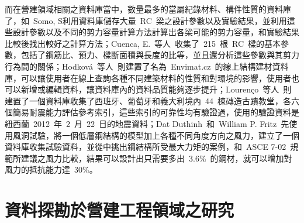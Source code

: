 而在營建領域相關之資料庫當中，數量最多的當屬紀錄材料、構件性質的資料庫了，如~Somo, S\cite{somo2006modeling}利用資料庫儲存大量~RC~梁之設計參數以及實驗結果，並利用這些設計參數以及不同的剪力容量計算方法計算出各梁可能的剪力容量，和實驗結果比較後找出較好之計算方法；Cuenca, E.~等人\cite{Cuenca20131089}~收集了~215~根~RC~樑的基本參數，包括了鋼筋比、預力、樑斷面積與長度的比等，並且還分析這些參數與其剪力行為間的關係；Hodkov{\'a}~等人\cite{hodkova2011envimat}~則建置了名為~Envimat.cz~的線上結構建材資料庫，可以讓使用者在線上查詢各種不同建築材料的性質和對環境的影響，使用者也可以新增或編輯資料，讓資料庫內的資料品質能夠逐步提升；Louren{\c{c}}o~等人\cite{lourencco2013simplified}~則建置了一個資料庫收集了西班牙、葡萄牙和義大利境內~44~棟磚造古蹟教堂，各六個簡易耐震能力評估參考索引，這些索引的可靠性均有驗證過，使用的驗證資料是紐西蘭~2012~年~2~月~22~日的地震資料；Dat Duthinh~和~William P. Fritz\cite{duthinh2006nonlinear}~先使用風洞試驗，將一個低層鋼結構的模型加上各種不同角度方向之風力，建立了一個資料庫收集試驗資料，並從中挑出鋼結構所受最大力矩的案例，和~ASCE 7-02\cite{asce2002minimum}~規範所建議之風力比較，結果可以設計出只需要多出~3.6\%~的鋼材，就可以增加對風力的抵抗能力達~30\%。


\section{資料探勘於營建工程領域之研究}

